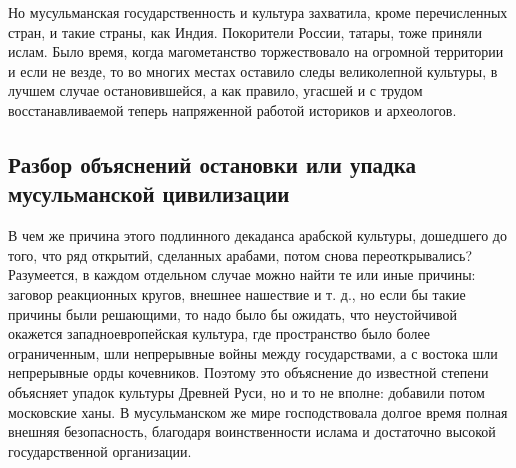 Но мусульманская государственность и культура захватила, кроме
перечисленных стран, и такие страны, как Индия. Покорители России,
татары, тоже приняли ислам. Было время, когда магометанство
торжествовало на огромной территории и если не везде, то во многих
местах оставило следы великолепной культуры, в лучшем случае
остановившейся, а как правило, угасшей и с трудом восстанавливаемой
теперь напряженной работой историков и археологов.

\subsection{Разбор объяснений остановки или упадка мусульманской
цивилизации}

В чем же причина этого подлинного декаданса арабской культуры,
дошедшего до того, что ряд открытий, сделанных арабами, потом снова
переоткрывались? Разумеется, в каждом отдельном случае можно найти те
или иные причины: заговор реакционных кругов, внешнее нашествие и т.
д., но если бы такие причины были решающими, то надо было бы ожидать,
что неустойчивой окажется западноевропейская культура, где
пространство было более ограниченным, шли непрерывные войны между
государствами, а с востока шли непрерывные орды кочевников. Поэтому
это объяснение до известной степени объясняет упадок культуры Древней
Руси, но и то не вполне: добавили потом московские ханы. В
мусульманском же мире господствовала долгое время полная внешняя
безопасность, благодаря воинственности ислама и достаточно высокой
государственной организации.

